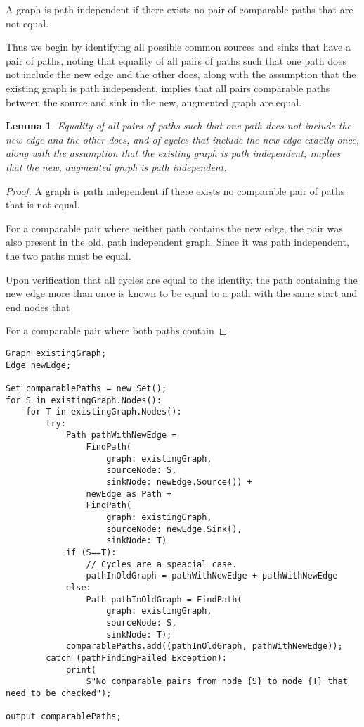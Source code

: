 \documentclass{article}
\newtheorem{lemma}{Lemma}
\begin{document}
A graph is path independent if there exists no pair of comparable paths that are not equal.

Thus we begin by identifying all possible common sources and sinks that have a pair of paths, noting that equality of all pairs of paths such that one path does not include the new edge and the other does, along with the assumption that the existing graph is path independent, implies that all pairs comparable paths between the source and sink in the new, augmented graph are equal. 

\begin{lemma}
Equality of all pairs of paths such that one path does not include the new edge and the other does, and of cycles that include the new edge exactly once, along with the assumption that the existing graph is path independent, implies that the new, augmented graph is path independent.
\end{lemma}
\begin{proof}
A graph is path independent if there exists no comparable pair of paths that is not equal.

For a comparable pair where neither path contains the new edge, the pair was also present in the old, path independent graph. Since it was path independent, the two paths must be equal.

Upon verification that all cycles are equal to the identity, the path containing the new edge more than once is known to be equal to a path with the same start and end nodes that 

For a comparable pair where both paths contain 
\end{proof}

\begin{verbatim}
Graph existingGraph;
Edge newEdge;

Set comparablePaths = new Set();
for S in existingGraph.Nodes():
    for T in existingGraph.Nodes():
        try:
            Path pathWithNewEdge = 
                FindPath(
                    graph: existingGraph, 
                    sourceNode: S,
                    sinkNode: newEdge.Source()) +
                newEdge as Path +
                FindPath(
                    graph: existingGraph, 
                    sourceNode: newEdge.Sink(), 
                    sinkNode: T)
            if (S==T):
                // Cycles are a speacial case.
                pathInOldGraph = pathWithNewEdge + pathWithNewEdge
            else:
                Path pathInOldGraph = FindPath(
                    graph: existingGraph, 
                    sourceNode: S, 
                    sinkNode: T);
            comparablePaths.add((pathInOldGraph, pathWithNewEdge));
        catch (pathFindingFailed Exception):
            print(
                $"No comparable pairs from node {S} to node {T} that need to be checked");

output comparablePaths;
\end{verbatim}
\end{document}
